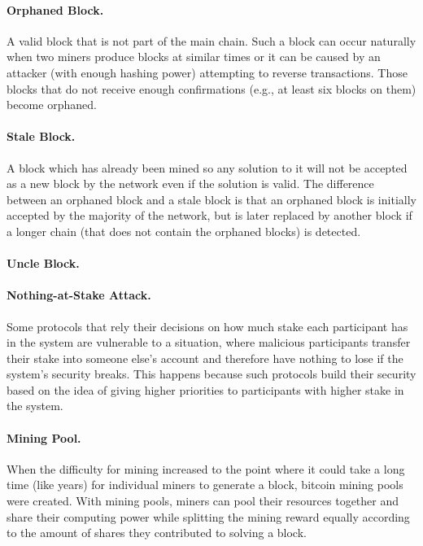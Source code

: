 \documentclass[11pt]{article}
\theoremstyle{mytheoremstyle}
\begin{document}
\paragraph{Orphaned Block.} A valid block that is not part of the main chain. Such a block can occur naturally when two miners produce blocks at similar times or it can be caused by an attacker (with enough hashing power) attempting to reverse transactions. Those blocks that do not receive enough confirmations (e.g., at least six blocks on them) become orphaned.

\paragraph{Stale Block.} A block which has already been mined so any solution to it will not be accepted as a new block by the network even if the solution is valid. The difference between an orphaned block and a stale block is that an orphaned block is initially accepted by the majority of the network, but is later replaced by another block if a longer chain (that does not contain the orphaned blocks) is detected.

\paragraph{Uncle Block.} 

\paragraph{Nothing-at-Stake Attack.} Some protocols that rely their decisions on how much stake each participant has in the system are vulnerable to a situation, where malicious participants transfer their stake into someone else's account and therefore have nothing to lose if the system's security breaks. This happens because such protocols build their security based on the idea of giving higher priorities to participants with higher stake in the system.

\paragraph{Mining Pool.} When the difficulty for mining increased to the
point where it could take a long time (like years) for individual
miners to generate a block, bitcoin mining pools were created. With
mining pools, miners can pool their resources together and share their
computing power while splitting the mining reward equally according
to the amount of shares they contributed to solving a block.
\end{document}
